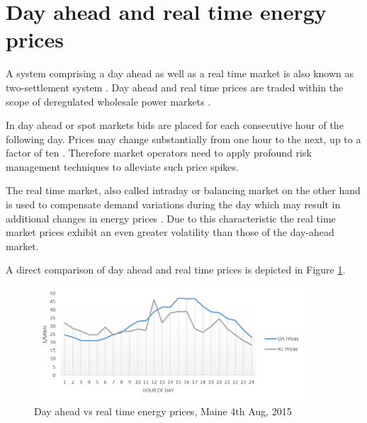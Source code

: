 



\section{Day ahead and real time energy prices} \label{sec:day_ahead_and_real_time_energy_prices}

A system comprising a day ahead as well as a real time market is also known as two-settlement system \cite{lambert2001creating}. Day ahead and real time prices are traded within the scope of deregulated wholesale power markets \cite{hogan1993competitive}. 

In day ahead or spot markets bids are placed for each consecutive hour of the following day. Prices may change substantially from one hour to the next, up to a factor of ten \cite{huisman2007hourly,weron2004modeling}. Therefore market operators need to apply profound risk management techniques to alleviate such price spikes.

The real time market, also called intraday or balancing market on the other hand is used to compensate demand variations during the day which may result in additional changes in energy prices \cite{barroso2005classification}. 
Due to this characteristic the real time market prices exhibit an even greater volatility than those of the day-ahead market. 

A direct comparison of day ahead and real time prices is depicted in Figure \ref{fig:da_vs_rt_prices_maine}.

\begin{figure}[!htbp]
	\centering
		\includegraphics[width=0.90\textwidth]{figures/data_analysis/day_ahead_vs_real_time_prices.png}
	\caption{Day ahead vs real time energy prices, Maine 4th Aug, 2015}
	\label{fig:da_vs_rt_prices_maine}
\end{figure}


